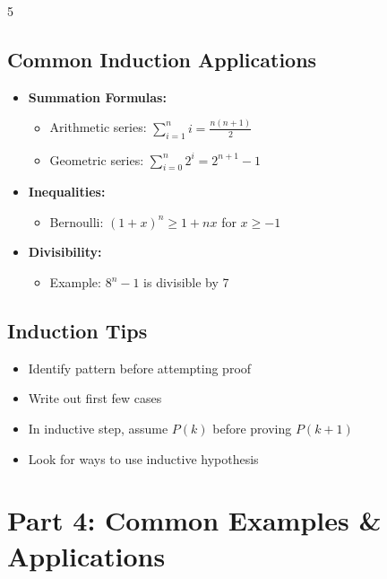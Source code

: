 \documentclass[a4paper,landscape]{article}
\begin{document}
\begin{multicols*}{5}
\subsection*{Common Induction Applications}
\begin{itemize}[leftmargin=*, itemsep=0pt]
    \item \textbf{Summation Formulas:}
    \begin{itemize}[leftmargin=*, itemsep=0pt]
        \item Arithmetic series: $\sum_{i=1}^n i = \frac{n(n+1)}{2}$
        \item Geometric series: $\sum_{i=0}^n 2^i = 2^{n+1} - 1$
    \end{itemize}
    \item \textbf{Inequalities:}
    \begin{itemize}[leftmargin=*, itemsep=0pt]
        \item Bernoulli: $(1+x)^n \geq 1 + nx$ for $x \geq -1$
    \end{itemize}
    \item \textbf{Divisibility:}
    \begin{itemize}[leftmargin=*, itemsep=0pt]
        \item Example: $8^n - 1$ is divisible by 7
    \end{itemize}
\end{itemize}

\subsection*{Induction Tips}
\begin{itemize}[leftmargin=*, itemsep=0pt]
    \item Identify pattern before attempting proof
    \item Write out first few cases
    \item In inductive step, assume $P(k)$ before proving $P(k+1)$
    \item Look for ways to use inductive hypothesis
\end{itemize}

\section*{Part 4: Common Examples \& Applications}


\end{multicols*}
\end{document}
